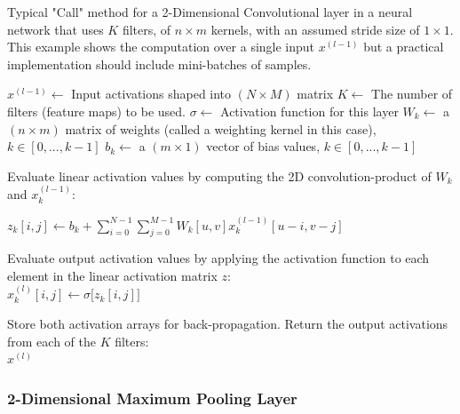 \documentclass[12pt,letterpaper]{article}
\begin{document}
\begin{algorithm}[H]
\caption{Typical "Call" method for a 2-Dimensional Convolutional layer in a neural network that uses $K$ filters, of $n \times m$ kernels, with an assumed stride size of $1 \times 1$. This example shows the computation over a single input $x^{(l-1)}$ but a practical implementation should include mini-batches of samples.}
\label{alg-CallConv2D}

\begin{algorithmic}
\REQUIRE $x^{(l-1)} \leftarrow$ Input activations shaped into $(N \times M)$ matrix
\REQUIRE $K \leftarrow$ The number of filters (feature maps) to be used.
\REQUIRE $\sigma \leftarrow$ Activation function for this layer
\REQUIRE $W_{k} \leftarrow$ a $(n \times m)$ matrix of weights 
(called a weighting kernel in this case), $k \in [0,...,k-1]$
\REQUIRE $b_{k} \leftarrow$ a $(m \times 1)$ vector of bias values, $k \in [0,...,k-1]$ \\

	\item Evaluate linear activation values by computing the 2D convolution-product of 
	$W_{k}$ and $x^{(l-1)}_{k}$:\\
	\item $z_{k}[i,j] \leftarrow b_{k} + 
	\sum_{i=0}^{N-1}\sum_{j=0}^{M-1} W_{k}[u,v] x^{(l-1)}_{k}[u-i,v-j]$ \\
	\item Evaluate output activation values by applying the activation function to each element in the linear activation 			matrix $z$:\\
	$x^{(l)}_{k}[i,j] \leftarrow \sigma\big[ z_{k}[i,j] \big]$ \\
\ENDFOR

Store both activation arrays for back-propagation. Return the output activations from each of the $K$ filters:\\
\RETURN $x^{(l)}$

\end{algorithmic}
\end{algorithm}


\subsubsection{2-Dimensional Maximum Pooling Layer}
\label{subsubsec-2DPool}
\end{document}
